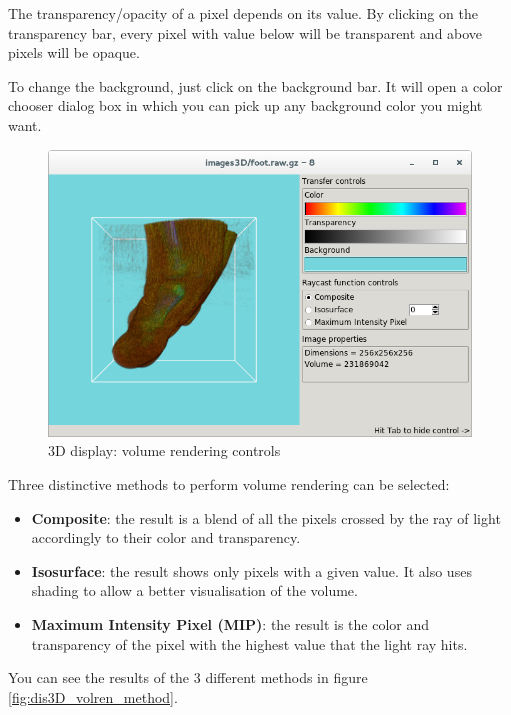 \documentclass[a4paper,10pt,oneside]{article}
\begin{document}
The transparency/opacity of a pixel depends on its value. By clicking on the 
transparency bar, every pixel with value below will be transparent and above
pixels will be opaque.

To change the background, just click on the background bar. It will open a
color chooser dialog box in which you can pick up any background color you
might want.

\begin{figure}
\centering
\includegraphics[scale=0.5]{images/dis3D_volren_ctrl.png}
\caption{3D display: volume rendering controls}
\label{fig:dis3D_volren_ctrl}
\end{figure}

Three distinctive methods to perform volume rendering can be selected:
\begin{itemize}
\item \textbf{Composite}: the result is a blend of all the pixels crossed by
the ray of light accordingly to their color and transparency.
\item \textbf{Isosurface}: the result shows only pixels with a given
value. It also uses shading to allow a better visualisation of the volume.
\item \textbf{Maximum Intensity Pixel (MIP)}: the result is the color and
transparency of the pixel with the highest value that the light ray hits.
\end{itemize}
You can see the results of the 3 different methods in figure 
\ref{fig:dis3D_volren_method}.
\end{document}
